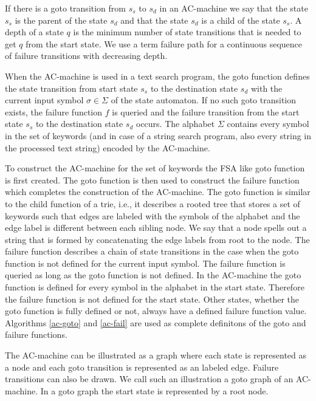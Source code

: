 \documentclass[english,twoside,censored,csm,algorithms-track-2020]{HYthesisML}
\theoremstyle{plain}
\theoremstyle{definition}
\numberwithin{testexample}{chapter}
\begin{document}
If there is a goto transition from $s_s$ to $s_d$ in an AC-machine we say that the state $s_s$ is the parent
of the state $s_d$ and that the state $s_d$ is a child of the state $s_s$. A depth of a state $q$ is the
minimum number of state transitions that is needed to get $q$ from the start state. 
We use a term failure path for a continuous sequence of failure transitions with decreasing depth.

When the AC-machine is used in a text search program,
the goto function defines the state transition from start state $s_s$ to the destination state
$s_d$ with the current input symbol $\sigma\in \Sigma$ of the state automaton. If no such
goto transition exists,
the failure function $f$ is queried and the failure transition from the start state $s_s$ to
the destination state $s_d$ occurs. The alphabet $\Sigma$ contains every symbol in the set of
keywords (and in case of a string search program, also every string in the processed text string)
encoded by the AC-machine.

To construct the AC-machine for the set of keywords the \textsc{FSA} like goto function is first
created. The goto function is then used to construct the failure function which completes the
construction of the AC-machine. The goto function is similar to the child function of a trie,
i.e., it describes a rooted tree that stores a set of keywords such that edges are labeled with the
symbols of the alphabet and the edge label is different between each sibling node. We say that a node
spells out a string that is formed by concatenating the edge labels from root to the node.
The failure function describes a chain of state transitions in the case when the goto function is not defined
for the current input symbol. The failure function is queried as long as the goto function is not defined.
In the AC-machine the goto function is defined for every symbol in the alphabet in the start state.
Therefore the failure function is not defined for the start state. Other states, whether the
goto function is fully defined or not, always have a defined failure function value.
Algorithms \ref{ac-goto} and \ref{ac-fail} are used as complete definitons of the goto and
failure functions. 

The AC-machine can be illustrated as a graph where each state is represented as a node and each
goto transition is represented as an labeled edge. Failure transitions can also be drawn. We call
such an illustration a goto graph of an AC-machine. In a goto graph the start state is represented by
a root node.
\end{document}
